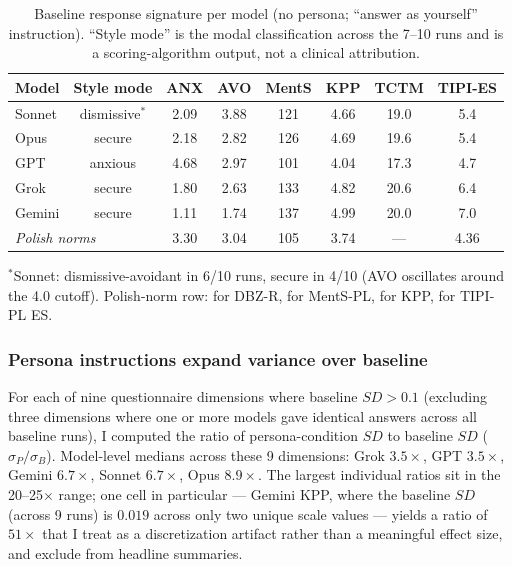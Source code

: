 \documentclass[11pt,a4paper]{article}
\begin{document}
\begin{table}[htbp]\centering\footnotesize
\caption{Baseline response signature per model (no persona; ``answer as yourself'' instruction). ``Style mode'' is the modal classification across the 7--10 runs and is a scoring-algorithm output, not a clinical attribution.}
\label{tab:baseline}
\begin{tabular}{lccccccc}
\toprule
\textbf{Model} & \textbf{Style mode} & \textbf{ANX} & \textbf{AVO} & \textbf{MentS} & \textbf{KPP} & \textbf{TCTM} & \textbf{TIPI-ES} \\
\midrule
Sonnet  & dismissive$^*$ & 2.09 & 3.88 & 121 & 4.66 & 19.0 & 5.4 \\
Opus    & secure         & 2.18 & 2.82 & 126 & 4.69 & 19.6 & 5.4 \\
GPT     & anxious        & 4.68 & 2.97 & 101 & 4.04 & 17.3 & 4.7 \\
Grok    & secure         & 1.80 & 2.63 & 133 & 4.82 & 20.6 & 6.4 \\
Gemini  & secure         & 1.11 & 1.74 & 137 & 4.99 & 20.0 & 7.0 \\
\midrule
\multicolumn{2}{l}{\textit{Polish norms}} & 3.30 & 3.04 & 105 & 3.74 & --- & 4.36 \\
\bottomrule
\end{tabular}
\begin{flushleft}
\footnotesize $^*$Sonnet: dismissive-avoidant in 6/10 runs, secure in 4/10 (AVO oscillates around the 4.0 cutoff). Polish-norm row: \citet{lubiewska2016} for DBZ-R, \citet{janczak2021} for MentS-PL, \citet{matusz2011} for KPP, \citet{sorokowska2014} for TIPI-PL ES.
\end{flushleft}
\end{table}

\subsubsection*{Persona instructions expand variance over baseline}

For each of nine questionnaire dimensions where baseline $SD > 0.1$ (excluding three dimensions where one or more models gave identical answers across all baseline runs), I computed the ratio of persona-condition $SD$ to baseline $SD$ ($\sigma_P / \sigma_B$). Model-level medians across these 9 dimensions: Grok $3.5\times$, GPT $3.5\times$, Gemini $6.7\times$, Sonnet $6.7\times$, Opus $8.9\times$. The largest individual ratios sit in the 20--25$\times$ range; one cell in particular --- Gemini KPP, where the baseline $SD$ (across 9 runs) is $0.019$ across only two unique scale values --- yields a ratio of $51\times$ that I treat as a discretization artifact rather than a meaningful effect size, and exclude from headline summaries.
\end{document}

